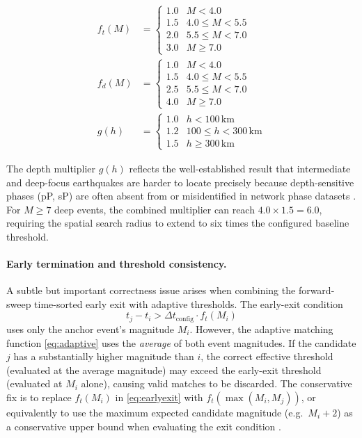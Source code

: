 \documentclass[12pt]{article}
\begin{document}
\begin{align}
  f_t(M) &=
  \begin{cases}
    1.0 & M < 4.0 \\
    1.5 & 4.0 \leq M < 5.5 \\
    2.0 & 5.5 \leq M < 7.0 \\
    3.0 & M \geq 7.0
  \end{cases}
  \label{eq:ft}
  \\[6pt]
  f_d(M) &=
  \begin{cases}
    1.0 & M < 4.0 \\
    1.5 & 4.0 \leq M < 5.5 \\
    2.5 & 5.5 \leq M < 7.0 \\
    4.0 & M \geq 7.0
  \end{cases}
  \label{eq:fd}
  \\[6pt]
  g(h) &=
  \begin{cases}
    1.0 & h < 100\,\text{km} \\
    1.2 & 100 \leq h < 300\,\text{km} \\
    1.5 & h \geq 300\,\text{km}
  \end{cases}
  \label{eq:gh}
\end{align}

The depth multiplier $g(h)$ reflects the well-established result that intermediate
and deep-focus earthquakes are harder to locate precisely because depth-sensitive
phases (pP, sP) are often absent from or misidentified in network phase datasets
\citep{Engdahl1998, Engdahl2020}.  For $M \geq 7$ deep events, the combined
multiplier can reach $4.0 \times 1.5 = 6.0$, requiring the spatial search
radius to extend to six times the configured baseline threshold.

\paragraph{Early termination and threshold consistency.}
A subtle but important correctness issue arises when combining the forward-sweep
time-sorted early exit with adaptive thresholds.  The early-exit condition
\begin{equation}
  t_j - t_i > \Delta t_{\mathrm{config}} \cdot f_t(M_i)
  \label{eq:earlyexit}
\end{equation}
uses only the anchor event's magnitude $M_i$.  However, the adaptive matching
function \eqref{eq:adaptive} uses the \emph{average} of both event magnitudes.
If the candidate $j$ has a substantially higher magnitude than $i$, the correct
effective threshold (evaluated at the average magnitude) may exceed the
early-exit threshold (evaluated at $M_i$ alone), causing valid matches to be
discarded.  The conservative fix is to replace $f_t(M_i)$ in
\eqref{eq:earlyexit} with $f_t(\max(M_i, M_j))$, or equivalently to use the
maximum expected candidate magnitude (e.g.\ $M_i + 2$) as a conservative upper
bound when evaluating the exit condition \citep{Patton2016}.
\end{document}
